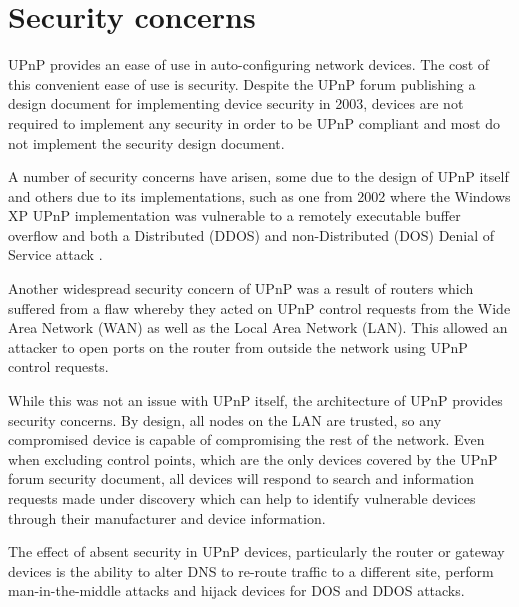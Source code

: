 \section{Security concerns}

UPnP provides an ease of use in auto-configuring network devices. The cost of this convenient ease of use is security. Despite the UPnP forum publishing a design document for implementing device security in 2003\cite{upnp-security}, devices are not required to implement any security in order to be UPnP compliant\cite{selen2006upnp} \cite{haque2007upnp} and most do not implement the security design document\cite{selen2006upnp}.

A number of security concerns have arisen, some due to the design of UPnP itself and others due to its implementations, such as one from 2002 where the Windows XP UPnP implementation was vulnerable to a remotely executable buffer overflow and both a Distributed (DDOS) and non-Distributed (DOS) Denial of Service attack\cite{winxp-upnp-flaw} \cite{haque2007upnp}.

Another widespread security concern of UPnP was a result of routers which suffered from a flaw whereby they acted on UPnP control requests from the Wide Area Network (WAN)\cite{wan} as well as the Local Area Network (LAN)\cite{lan}. This allowed an attacker to open ports on the router from outside the network using UPnP control requests.

While this was not an issue with UPnP itself, the architecture of UPnP provides security concerns. By design, all nodes on the LAN are trusted, so any compromised device is capable of compromising the rest of the network. Even when excluding control points, which are the only devices covered by the UPnP forum security document\cite{upnp-security}, all devices will respond to search and information requests made under discovery which can help to identify vulnerable devices through their manufacturer and device information.

The effect of absent security in UPnP devices, particularly the router or gateway devices is the ability to alter DNS to re-route traffic to a different site, perform man-in-the-middle attacks\cite{man-in-the-middle} and hijack devices for DOS and DDOS attacks\cite{akamai-ddos}.